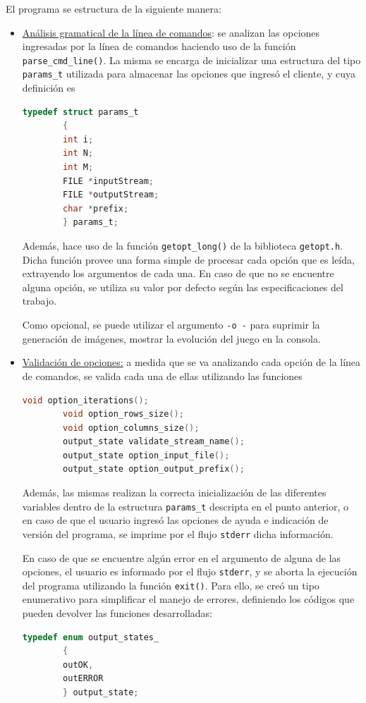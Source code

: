 El programa se estructura de la siguiente manera:
\begin{itemize}
	\item \underline{Análisis gramatical de la línea de comandos}: se analizan las opciones ingresadas por la línea de comandos haciendo uso de la función \texttt{parse\_cmd\_line()}. La misma se encarga de inicializar una estructura del tipo \texttt{params\_t} utilizada para almacenar las opciones que ingresó el cliente, y cuya definición es
	\begin{lstlisting}[language=C, style=StyleC]
    	typedef struct params_t
    	{
    	int i;
    	int N;
    	int M;
    	FILE *inputStream;
    	FILE *outputStream;
    	char *prefix;
    	} params_t;
	\end{lstlisting}
	Además, hace uso de la función \texttt{getopt\_long()} de la biblioteca \texttt{getopt.h}. Dicha función provee una forma simple de procesar cada opción que es leída, extrayendo los argumentos de cada una. En caso de que no se encuentre alguna opción, se utiliza su valor por defecto según las especificaciones del trabajo.
	
	Como opcional, se puede utilizar el argumento \texttt{-o -} para suprimir la generación de imágenes, mostrar la evolución del juego en la consola.

	\item \underline{Validación de opciones:} a medida que se va analizando cada opción de la línea de comandos, se valida cada una de ellas utilizando las funciones 
	\begin{lstlisting}[language=C, style=StyleC]
    	void option_iterations();
    	void option_rows_size();
    	void option_columns_size();
    	output_state validate_stream_name();
    	output_state option_input_file();
    	output_state option_output_prefix();
    \end{lstlisting}
    Además, las mismas realizan la correcta inicialización de las diferentes variables dentro de la estructura \texttt{params\_t} descripta en el punto anterior, o en caso de que el usuario ingresó las opciones de ayuda e indicación de versión del programa, se imprime por el flujo \texttt{stderr} dicha información.
    
	En caso de que se encuentre algún error en el argumento de alguna de las opciones, el usuario es informado por el flujo \texttt{stderr}, y se aborta la ejecución del programa utilizando la función \texttt{exit()}. Para ello, se creó un tipo enumerativo para simplificar el manejo de errores, definiendo los códigos que pueden devolver las funciones desarrolladas:
	\begin{lstlisting}[language=C, style=StyleC]
		typedef enum output_states_
		{
		outOK,
		outERROR
		} output_state;
	\end{lstlisting}
	

\end{itemize}
